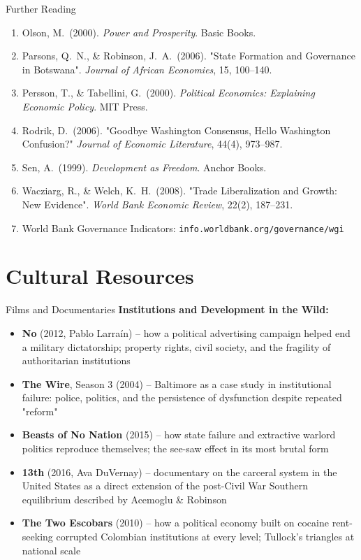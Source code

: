 \documentclass[10pt]{beamer}
\begin{document}
\begin{frame}[allowframebreaks]{Further Reading}
\begin{enumerate}
\item Olson, M.\ (2000). \emph{Power and Prosperity}. Basic Books.
\item Parsons, Q.\ N., \& Robinson, J.\ A.\ (2006). "State Formation and Governance in Botswana". \emph{Journal of African Economies}, 15, 100--140.
\item Persson, T., \& Tabellini, G.\ (2000). \emph{Political Economics: Explaining Economic Policy}. MIT Press.
\item Rodrik, D.\ (2006). "Goodbye Washington Consensus, Hello Washington Confusion?" \emph{Journal of Economic Literature}, 44(4), 973--987.
\item Sen, A.\ (1999). \emph{Development as Freedom}. Anchor Books.
\item Wacziarg, R., \& Welch, K.\ H.\ (2008). "Trade Liberalization and Growth: New Evidence". \emph{World Bank Economic Review}, 22(2), 187--231.
\item World Bank Governance Indicators: \texttt{info.worldbank.org/governance/wgi}
\end{enumerate}
\end{frame}


\section*{Cultural Resources}

\begin{frame}{Films and Documentaries}
\textbf{Institutions and Development in the Wild:}
\begin{itemize}
\item \textbf{No} (2012, Pablo Larraín) -- how a political advertising campaign helped end a military dictatorship; property rights, civil society, and the fragility of authoritarian institutions
\item \textbf{The Wire}, Season 3 (2004) -- Baltimore as a case study in institutional failure: police, politics, and the persistence of dysfunction despite repeated "reform"
\item \textbf{Beasts of No Nation} (2015) -- how state failure and extractive warlord politics reproduce themselves; the see-saw effect in its most brutal form
\item \textbf{13th} (2016, Ava DuVernay) -- documentary on the carceral system in the United States as a direct extension of the post-Civil War Southern equilibrium described by Acemoglu \& Robinson
\item \textbf{The Two Escobars} (2010) -- how a political economy built on cocaine rent-seeking corrupted Colombian institutions at every level; Tullock's triangles at national scale
\end{itemize}
\end{frame}
\end{document}
